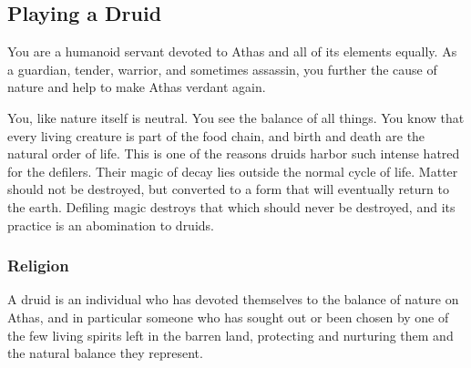 



\subsection{Playing a Druid}
You are a humanoid servant devoted to Athas and all of its elements equally. As a guardian, tender, warrior, and sometimes assassin, you further the cause of nature and help to make Athas verdant again.

You, like nature itself is neutral. You see the balance of all things. You know that every living creature is part of the food chain, and birth and death are the natural order of life. This is one of the reasons druids harbor such intense hatred for the defilers. Their magic of decay lies outside the normal cycle of life. Matter should not be destroyed, but converted to a form that will eventually return to the earth. Defiling magic destroys that which should never be destroyed, and its practice is an abomination to druids.

\subsubsection{Religion}
A druid is an individual who has devoted themselves to the balance of nature on Athas, and in particular someone who has sought out or been chosen by one of the few living spirits left in the barren land, protecting and nurturing them and the natural balance they represent.

